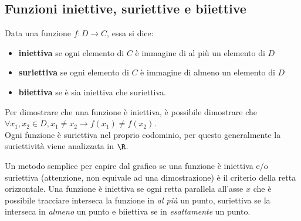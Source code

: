 \documentclass{article}     %
\begin{document}
        \subsection{Funzioni iniettive, suriettive e biiettive}
        \begin{boxdef}
            Data una funzione $f:D\rightarrow C$, essa si dice:
            \begin{itemize}
                \item \textbf{iniettiva} se ogni elemento di $C$ è immagine di \textnormal{al più} un elemento di $D$
                \item \textbf{suriettiva} se ogni elemento di $C$ è immagine di \textnormal{almeno} un elemento di $D$
                \item \textbf{biiettiva} se è sia iniettiva che suriettiva.
            \end{itemize}
            Per dimostrare che una funzione è iniettiva, è possibile dimostrare che $\forall x_1,x_2 \in D, x_1\neq x_2\rightarrow f(x_1)\neq f(x_2)$.\\
            Ogni funzione è suriettiva nel proprio codominio, per questo generalmente la suriettività viene analizzata in $\R$.
        \end{boxdef}
        Un metodo semplice per capire dal grafico se una funzione è iniettiva e/o suriettiva (attenzione, non equivale ad una dimostrazione) è il criterio della retta orizzontale. Una funzione è iniettiva se ogni retta parallela all'asse $x$ che è possibile tracciare interseca la funzione in \textit{al più} un punto, suriettiva se la interseca in \textit{almeno} un punto e biiettiva se in \textit{esattamente} un punto.
\end{document}
